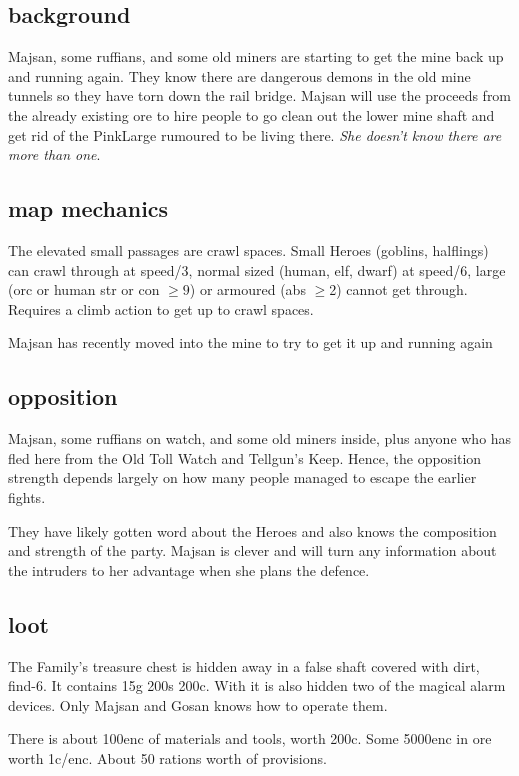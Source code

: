 \subsection*{background}
Majsan, some ruffians, and some old miners are starting to get the mine back up and running again. They know there are dangerous demons in the old mine tunnels so they have torn down the rail bridge. Majsan will use the proceeds from the already existing ore to hire people to go clean out the lower mine shaft and get rid of the PinkLarge rumoured to be living there. \textit{She doesn't know there are more than one}.


\subsection*{map mechanics}
The elevated small passages are crawl spaces. Small Heroes (goblins, halflings) can crawl through at speed/3, normal sized (human, elf, dwarf) at speed/6, large (orc or human str or con $\geq9$) or armoured (abs $\geq$2) cannot get through. Requires a climb action to get up to crawl spaces.

Majsan has recently moved into the mine to try to get it up and running again


\subsection*{opposition}
Majsan, some ruffians on watch, and some old miners inside, plus anyone who has fled here from the Old Toll Watch and Tellgun's Keep. Hence, the opposition strength depends largely on how many people managed to escape the earlier fights.

They have likely gotten word about the Heroes and also knows the composition and strength of the party. Majsan is clever and will turn any information about the intruders to her advantage when she plans the defence.


\subsection*{loot}
The Family's treasure chest is hidden away in a false shaft covered with dirt, find-6. It contains 15g 200s 200c. With it is also hidden two of the magical alarm devices. Only Majsan and Gosan knows how to operate them.

There is about 100enc of materials and tools, worth 200c. Some 5000enc in ore worth 1c/enc. About 50 rations worth of provisions.









